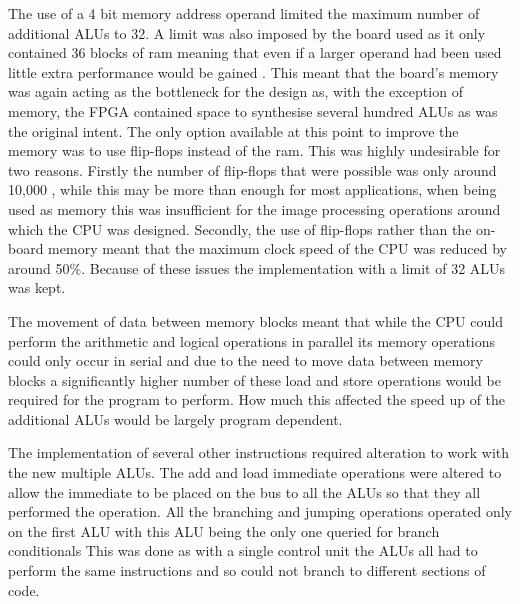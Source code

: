 The use of a 4 bit memory address operand limited the maximum number of additional ALUs to 32. A limit was also imposed by the board used as it only contained 36 blocks of ram meaning that even if a larger operand had been used little extra performance would be gained \cite{spartan_ram}. This meant that the board's memory was again acting as the bottleneck for the design as, with the exception of memory, the FPGA contained space to synthesise several hundred ALUs as was the original intent. The only option available at this point  to improve the memory was to use flip-flops instead of the ram. This was highly undesirable for two reasons. Firstly the number of flip-flops that were possible was only around 10,000 \cite{spartan_user}, while this may be more than enough for most applications, when being used as memory this was insufficient for the image processing operations around which the CPU was designed. Secondly, the use of flip-flops rather than the on-board memory meant that the maximum clock speed of the CPU was reduced by around 50\%. Because of these issues the implementation with a limit of 32 ALUs was kept.

The movement of data between memory blocks meant that while the CPU could perform the arithmetic and logical operations in parallel its memory operations could only occur in serial and due to the need to move data between memory blocks a significantly higher number of these load and store operations would be required for the program to perform. How much this affected the speed up of the additional ALUs would be largely program dependent. 

The implementation of several other instructions required alteration to work with the new multiple ALUs. The add and load immediate operations were altered to allow the immediate to be placed on the bus to all the ALUs so that they all performed the operation. All the branching and jumping operations operated only on the first ALU with this ALU being the only one  queried for branch conditionals This was done as with a single control unit the ALUs all had to perform the same instructions and so could not branch to different sections of code.
